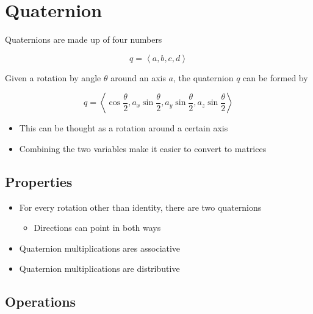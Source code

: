 \chapter{Quaternion}

Quaternions are made up of four numbers

\begin{equation}
  q = \left< a, b, c, d \right>
\end{equation}

Given a rotation by angle $ \theta $ around an axis $ a $, the quaternion $ q $
can be formed by

\begin{equation}
  q =
  \left<
    \cos\frac{\theta}{2},
    a_{x} \sin\frac{\theta}{2},
    a_{y} \sin\frac{\theta}{2},
    a_{z} \sin\frac{\theta}{2}
  \right>
\end{equation}

\begin{itemize}
  \item This can be thought as a rotation around a certain axis
  \item Combining the two variables make it easier to convert to matrices
\end{itemize}

\section{Properties}

  \begin{itemize}
    \item For every rotation other than identity, there are two quaternions
    \begin{itemize}
      \item Directions can point in both ways
    \end{itemize}

    \item Quaternion multiplications ares associative
    \item Quaternion multiplications are distributive
  \end{itemize}

\section{Operations}

